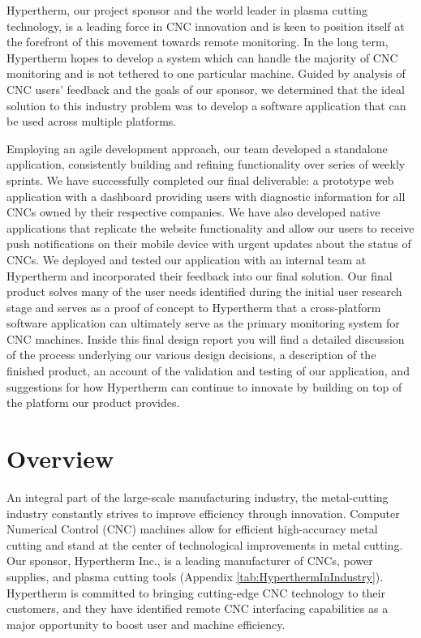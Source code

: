 \documentclass[12pt,letterpaper,titlepage]{article}
\begin{document}
Hypertherm, our project sponsor and the world leader in plasma cutting technology, is a leading force in CNC innovation and is keen to position itself at the forefront of this movement towards remote monitoring. In the long term, Hypertherm hopes to develop a system which can handle the majority of CNC monitoring and is not tethered to one particular machine. Guided by analysis of CNC users' feedback and the goals of our sponsor, we determined that the ideal solution to this industry problem was to develop a software application that can be used across multiple platforms.

Employing an agile development approach, our team developed a standalone application, consistently building and refining functionality over series of weekly sprints. We have successfully completed our final deliverable: a prototype web application with a dashboard providing users with diagnostic information for all CNCs owned by their respective companies. We have also developed native applications that replicate the website functionality and allow our users to receive push notifications on their mobile device with urgent updates about the status of CNCs. We deployed and tested our application with an internal team at Hypertherm and incorporated their feedback into our final solution. Our final product solves many of the user needs identified during the initial user research stage and serves as a proof of concept to Hypertherm that a cross-platform software application can ultimately serve as the primary monitoring system for CNC machines. Inside this final design report you will find a detailed discussion of the process underlying our various design decisions, a description of the finished product, an account of the validation and testing of our application, and suggestions for how Hypertherm can continue to innovate by building on top of the platform our product provides.

\thispagestyle{empty}
\newpage
\setcounter{page}{1}
\section{Overview} \label{sec:Overview}

An integral part of the large-scale manufacturing industry, the metal-cutting industry constantly strives to improve efficiency through innovation. Computer Numerical Control (CNC) machines allow for efficient high-accuracy metal cutting and stand at the center of technological improvements in metal cutting. Our sponsor, Hypertherm Inc., is a leading manufacturer of CNCs, power supplies, and plasma cutting tools (Appendix \ref{tab:HyperthermInIndustry}). Hypertherm is committed to bringing cutting-edge CNC technology to their customers, and they have identified remote CNC interfacing capabilities as a major opportunity to boost user and machine efficiency.
\end{document}

